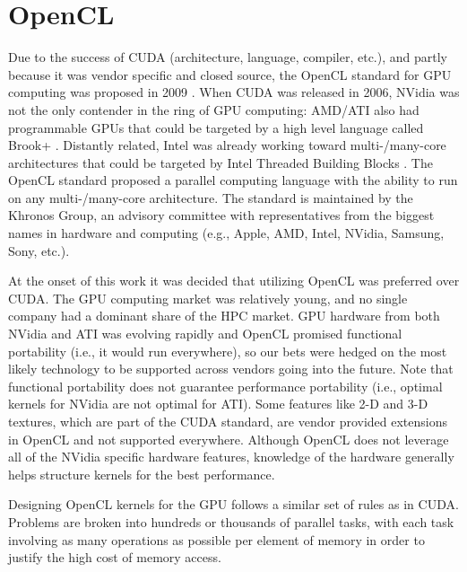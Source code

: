\documentclass{report}
\begin{document}
\section{OpenCL}

Due to the success of CUDA (architecture, language, compiler, etc.), and partly because it was vendor specific and closed source, the OpenCL standard for GPU computing was proposed in 2009 \cite{OpenCL2009}. When CUDA was released in 2006, NVidia was not the only contender in the ring of GPU computing: AMD/ATI also had programmable GPUs that could be targeted by a high level language called Brook+ \cite{BrookGPU2004}. Distantly related, Intel was already working toward multi-/many-core architectures that could be targeted by Intel Threaded Building Blocks \cite{IntelTBB}. The OpenCL standard proposed a parallel computing language with the ability to run on any multi-/many-core architecture. The standard is maintained by the Khronos Group, an advisory committee with representatives from the biggest names in hardware and computing (e.g., Apple, AMD, Intel, NVidia, Samsung, Sony, etc.). 

At the onset of this work it was decided that utilizing OpenCL was preferred over CUDA. The GPU computing market was relatively young, and no single company had a dominant share of the HPC market. GPU hardware from both NVidia and ATI was evolving rapidly and OpenCL promised functional portability (i.e., it would run everywhere), so our bets were hedged on the most likely technology to be supported across vendors going into the future. Note that functional portability does not guarantee performance portability (i.e., optimal kernels for NVidia are not optimal for ATI). Some features like 2-D and 3-D textures, which are part of the CUDA standard, are vendor provided extensions in OpenCL and not supported everywhere. Although OpenCL does not leverage all of the NVidia specific hardware features, knowledge of the hardware generally helps structure kernels for the best performance. 



Designing OpenCL kernels for the GPU follows a similar set of rules as in CUDA. Problems are broken into hundreds or thousands of parallel tasks, with each task involving as many operations as possible per element of memory in order to justify the high cost of memory access.
\end{document}
